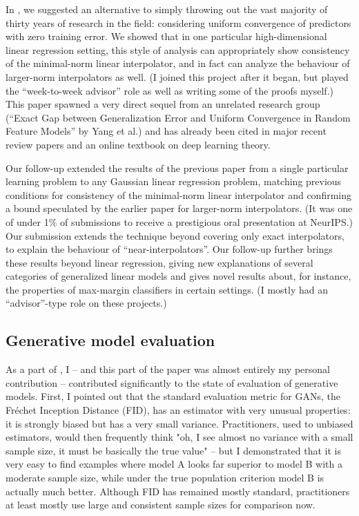 \documentclass[12pt]{article}
\begin{document}
In \cite{zhou:uniform-interpolation}, we suggested an alternative to simply throwing out the vast majority of thirty years of research in the field: considering uniform convergence of predictors with zero training error. We showed that in one particular high-dimensional linear regression setting, this style of analysis can appropriately show consistency of the minimal-norm linear interpolator, and in fact can analyze the behaviour of larger-norm interpolators as well. (I joined this project after it began, but played the ``week-to-week advisor'' role as well as writing some of the proofs myself.) This paper spawned a very direct sequel from an unrelated research group (``Exact Gap between Generalization Error and Uniform Convergence in Random Feature Models'' by Yang et al.) and has already been cited in major recent review papers and an online textbook on deep learning theory.

Our follow-up \cite{koehler:gaussian-interpolators} extended the results of the previous paper from a single particular learning problem to any Gaussian linear regression problem, matching previous conditions for consistency of the minimal-norm linear interpolator and confirming a bound speculated by the earlier paper for larger-norm interpolators.
(It was one of under 1\% of submissions to receive a prestigious oral presentation at NeurIPS.)
Our submission \cite{zhou:optimistic-rates} extends the technique beyond covering only exact interpolators, to explain the behaviour of ``near-interpolators''.
Our follow-up \Cite{zhou:moreau} further brings these results beyond linear regression,
giving new explanations of several categories of generalized linear models
and gives novel results about, for instance, the properties of max-margin classifiers in certain settings.
(I mostly had an ``advisor''-type role on these projects.)


\subsection{Generative model evaluation} \label{sec:kid}

As a part of \cite{binkowski:mmd-gans}, I – and this part of the paper was almost entirely my personal contribution – contributed significantly to the state of evaluation of generative models. First, I pointed out that the standard evaluation metric for GANs, the Fréchet Inception Distance (FID), has an estimator with very unusual properties: it is strongly biased but has a very small variance. Practitioners, used to unbiased estimators, would then frequently think "oh, I see almost no variance with a small sample size, it must be basically the true value" – but I demonstrated that it is very easy to find examples where model A looks far superior to model B with a moderate sample size, while under the true population criterion model B is actually much better. Although FID has remained mostly standard, practitioners at least mostly use large and consistent sample sizes for comparison now.
\end{document}
